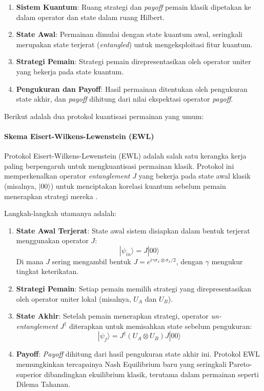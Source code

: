 \begin{enumerate}
    \item \textbf{Sistem Kuantum}: Ruang strategi dan \textit{payoff} pemain klasik dipetakan ke dalam operator dan state dalam ruang Hilbert.
    \item \textbf{State Awal}: Permainan dimulai dengan state kuantum awal, seringkali merupakan state terjerat (\textit{entangled}) untuk mengeksploitasi fitur kuantum.
    \item \textbf{Strategi Pemain}: Strategi pemain direpresentasikan oleh operator uniter yang bekerja pada state kuantum.
    \item \textbf{Pengukuran dan Payoff}: Hasil permainan ditentukan oleh pengukuran state akhir, dan \textit{payoff} dihitung dari nilai ekspektasi operator \textit{payoff}.
\end{enumerate}

Berikut adalah dua protokol kuantisasi permainan yang umum:

\paragraph{Skema Eisert-Wilkens-Lewenstein (EWL)}

Protokol Eisert-Wilkens-Lewenstein (EWL) adalah salah satu kerangka kerja paling berpengaruh untuk mengkuantisasi permainan klasik. Protokol ini memperkenalkan operator \textit{entanglement} $J$ yang bekerja pada state awal klasik (misalnya, $|00\rangle$) untuk menciptakan korelasi kuantum sebelum pemain menerapkan strategi mereka \citep{eisert_quantum_1999, samadi_quantum_2017}.

Langkah-langkah utamanya adalah:

\begin{enumerate}
    \item \textbf{State Awal Terjerat}: State awal sistem disiapkan dalam bentuk terjerat menggunakan operator $J$:
    \[ |\psi_{in}\rangle = J |00\rangle \]
    Di mana $J$ sering mengambil bentuk $J = e^{i\gamma \sigma_x \otimes \sigma_x / 2}$, dengan $\gamma$ mengukur tingkat keterikatan.
    \item \textbf{Strategi Pemain}: Setiap pemain memilih strategi yang direpresentasikan oleh operator uniter lokal (misalnya, $U_A$ dan $U_B$).
    \item \textbf{State Akhir}: Setelah pemain menerapkan strategi, operator \textit{un-entanglement} $J^\dagger$ diterapkan untuk memisahkan state sebelum pengukuran:
    \[ |\psi_f\rangle = J^\dagger (U_A \otimes U_B) J |00\rangle \]
    \item \textbf{Payoff}: \textit{Payoff} dihitung dari hasil pengukuran state akhir ini. Protokol EWL memungkinkan tercapainya Nash Equilibrium baru yang seringkali Pareto-superior dibandingkan ekuilibrium klasik, terutama dalam permainan seperti Dilema Tahanan.
\end{enumerate}

